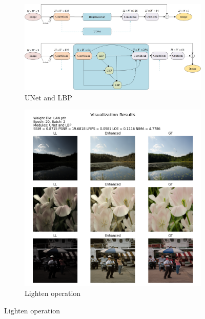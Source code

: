 \documentclass[a4paper]{ctexart}
\begin{document}
		\begin{figure}[htbp]
			\centering
			\begin{subfigure}{0.8\textwidth}
				\includegraphics[width=\linewidth]{picture/LLIE/Experiment/UNet and LBP}
				\captionsetup{font=scriptsize}
				\caption{UNet and LBP}
				\label{fig: UNet and LBP}
			\end{subfigure}
			\begin{subfigure}{0.8\textwidth}
				\includegraphics[width=\linewidth]{picture/LLIE/Experiment/myplot_LAN}
				\captionsetup{font=scriptsize}
				\caption{Lighten operation}
				\label{fig：myplot_LAN}
			\end{subfigure}
		\end{figure}
		
\end{document}
